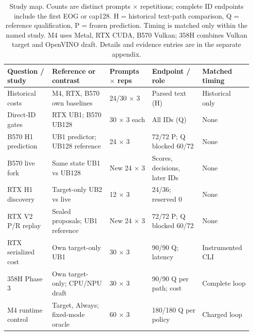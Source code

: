 \begin{table}[t]
\caption{Study map. Counts are distinct prompts $\times$ repetitions; complete ID endpoints include the first EOG or cap128. H = historical text-path comparison, Q = reference qualification, P = frozen prediction. Timing is matched only within the named study. M4 uses Metal, RTX CUDA, B570 Vulkan; 358H combines Vulkan target and OpenVINO draft. Details and evidence entries are in the separate appendix.}
\label{tab:studymap}
\label{tab:platforms}
\centering
\begin{tabular}{@{}p{1.26in}p{1.50in}p{.65in}p{1.40in}p{1.15in}@{}}
\toprule
Question / study & Reference or contrast & Prompts $\times$ reps & Endpoint / role & Matched timing \\
\midrule
Historical costs & M4, RTX, B570 own baselines & 24/30 $\times$ 3 & Parsed text (H) & Historical only \\
Direct-ID gates & RTX UB1; B570 UB128 & 30 $\times$ 3 each & All IDs (Q) & None \\
B570 H1 prediction & UB1 predictor; UB128 reference & 24 $\times$ 3 & 72/72 P; Q blocked 60/72 & None \\
B570 live fork & Same state UB1 vs UB128 & New 24 $\times$ 3 & Scores, decisions, later IDs & None \\
RTX H1 discovery & Target-only UB2 vs live & 12 $\times$ 3 & 24/36; reserved 0 & None \\
RTX V2 P/R replay & Sealed proposals; UB1 reference & New 24 $\times$ 3 & 72/72 P; Q blocked 60/72 & None \\
RTX serialized cost & Own target-only UB1 & 30 $\times$ 3 & 90/90 Q; latency & Instrumented CLI \\
358H Phase 3 & Own target-only; CPU/NPU draft & 30 $\times$ 3 & 90/90 Q per path; cost & Complete loop \\
M4 runtime control & Target, Always; fixed-mode oracle & 60 $\times$ 3 & 180/180 Q per policy & Charged loop \\
\bottomrule
\end{tabular}
\end{table}
